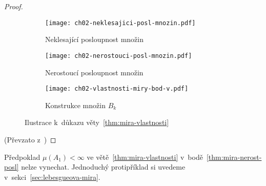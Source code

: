 \begin{proof}
\begin{figure}[h]
\begin{subfigure}{0.45\textwidth}
            \texttt{[image: ch02-neklesajici-posl-mnozin.pdf]}
            \caption{Neklesající posloupnost množin}
            \label{fig:nekl-posl-mnozin}
        \end{subfigure}
        \qquad
        \begin{subfigure}{0.45\textwidth}
            \texttt{[image: ch02-nerostouci-posl-mnozin.pdf]}
            \caption{Nerostoucí posloupnost množin}
            \label{fig:nerost-posl-mnozin}
        \end{subfigure}
        \begin{subfigure}{0.45\textwidth}
            \texttt{[image: ch02-vlastnosti-miry-bod-v.pdf]}
            \caption{Konstrukce množin $B_k$}
            \label{fig:vlastnosti-miry-bod-v}
        \end{subfigure}
        \caption{Ilustrace k~důkazu věty~\ref{thm:mira-vlastnosti}}
    \end{figure}
    (Převzato z~\citep[str. 19]{NetukaIntegral2016})
\end{proof}
\begin{remark}
    Předpoklad $\mu(A_1)<\infty$ ve větě~\ref{thm:mira-vlastnosti} v~bodě~\ref{thm:mira-nerost-posl} nelze vynechat. Jednoduchý protipříklad si uvedeme v~sekci~\ref{sec:lebesgueova-mira}.
\end{remark}